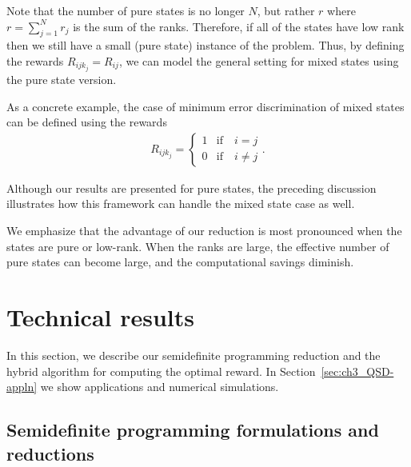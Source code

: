 Note that the number of pure states is no longer $N$, but rather $r$ where $r = \sum_{j=1}^N r_{j}$ is the sum of the ranks. 
Therefore, if all of the states have low rank then we still have a small (pure state) instance of the problem. 
Thus, by defining the rewards $R_{ijk_j} = R_{ij}$, we can model the general setting for mixed states using the pure state version.

As a concrete example, the case of minimum error discrimination of mixed states can be defined using the rewards 
\begin{align}
    \label{eq:ch3_QSD-min_class}
    R_{ijk_j} =
    \begin{cases}
        1 & \text{if} \quad i = j \\ 
        0 & \text{if} \quad i \neq j 
    \end{cases}. 
\end{align}

\begin{remark}
Although our results are presented for pure states, the preceding discussion illustrates how this framework can handle the mixed state case as well.  
\end{remark}

\begin{remark}
We emphasize that the advantage of our reduction is most pronounced when the states are pure or low-rank. 
When the ranks are large, the effective number of pure states can become large, and the computational savings diminish.
\end{remark}

\section{Technical results} \label{sec:ch3_QSD-SDP_redn}

In this section, we describe our semidefinite programming reduction and the hybrid algorithm for computing the optimal reward.
In Section~\ref{sec:ch3_QSD-appln} we show applications and numerical simulations.

\subsection{Semidefinite programming formulations and reductions}

